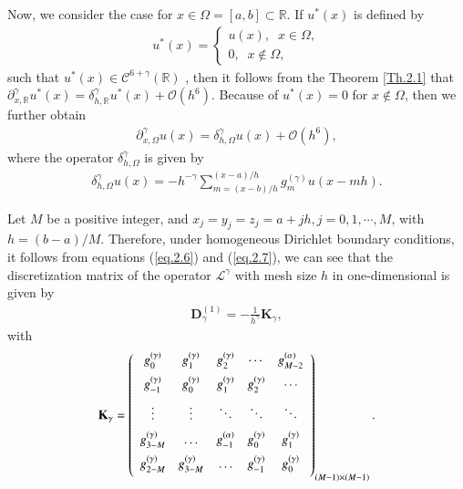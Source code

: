 \documentclass{siamart171218}
\numberwithin{theorem}{section}
\numberwithin{equation}{section}
\begin{document}
Now, we consider the case for $x\in \Omega=[a,b]\subset\mathds{{R}}$.
If $u^{*}(x)$ is defined by
\begin{eqnarray*}
u^{*}(x)=\left\{
\begin{array}{lll}
u(x),\;\;x\in\Omega,\\
0,\;\;x\notin\Omega,
\end{array}
\right.
\end{eqnarray*}
such that $u^{*}(x)\in
\mathscr{C}^{6+\gamma}(\mathds{{R}})$ , then it follows from the Theorem \ref{Th.2.1} that
$
\partial_{x,\mathds{R}}^\gamma u^{*}(x)= {\delta}_{h,\mathds{R}}^{\gamma}u^{*}(x)
+\mathcal{O}\left(h^6\right).
$
Because of $u^{*}(x)=0$ for $x\notin\Omega$, then we further obtain
\begin{equation}\label{eq.2.6}
\begin{aligned}\displaystyle
\partial_{x,\Omega}^\gamma u(x)= {\delta}_{h,\Omega}^{\gamma}u(x)
+\mathcal{O}\left(h^6\right),
\end{aligned}
\end{equation}
where the operator
${\delta}_{h,\Omega}^{\gamma}$ is given by
\begin{equation}\label{eq.2.7}
\begin{aligned}\displaystyle
{\delta}_{h,\Omega}^{\gamma}u(x)=-{h^{-\gamma}}
\sum\limits_{m=(x-b)/h}^{(x-a)/h}g_{m}^{(\gamma)}u\left(x-mh\right).
\end{aligned}
\end{equation}

 Let $M$ be a positive integer, and
 $x_j=y_j=z_j=a+jh,j=0,1,\cdots,M$, with $h=(b-a)/M$.
 Therefore, under homogeneous Dirichlet boundary conditions, it follows from
 equations (\ref{eq.2.6}) and (\ref{eq.2.7}), we
 can see that the discretization
matrix of  the operator $\mathcal{L}^\gamma$ with mesh size $h$
 in one-dimensional is given by
 \begin{equation*}
\begin{aligned}\displaystyle
\mathbf{D}_\gamma^{(1)}=-\frac{1}{h^\gamma}\mathbf{K}_\gamma,
\end{aligned}
\end{equation*}
 with
$$\mathbf{K}_\gamma=
\left(
  \begin{array}{ccccc}
   g_{0}^{(\gamma)} & g_{1}^{(\gamma)}& g_{2}^{(\gamma)}
    & \cdots & g_{M-2}^{(\alpha)} \vspace{0.2 cm}\\
   g_{-1}^{(\gamma)} & g_{0}^{(\gamma)} & g_{1}^{(\gamma)}
    & g_{2}^{(\gamma)}& \cdots \vspace{0.2 cm}\\
    \vdots &\vdots & \ddots & \ddots & \ddots \vspace{0.2 cm}\\
  g_{3-M}^{(\gamma)} & \ldots & g_{-1}^{(\alpha)}&g_{0}^{(\gamma)}&
  g_{1}^{(\gamma)} \vspace{0.2 cm}\\
g_{2-M}^{(\gamma)}& g_{3-M}^{(\gamma)}& \ldots & g_{-1}^{(\gamma)}&
  g_{0}^{(\gamma)} \vspace{0.2 cm}\\
  \end{array}
\right)_{(M-1)\times(M-1)}.
$$
\end{document}
